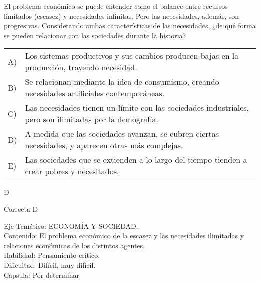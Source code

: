 \documentclass[letterpaper,11pt]{article}
\newcommand{\anchopregunta}{0.9\textwidth}
\begin{document}
\begin{enumerate}


\begin{minipage}{\anchopregunta}
\item El problema económico se puede entender como el balance entre recursos limitados (escasez) y necesidades infinitas. Pero las necesidades, además, son progresivas. Considerando ambas características de las necesidades, ¿de qué forma se pueden relacionar con las sociedades durante la historia?
\begin{flushleft}\begin{tabular}{@{\hspace{-.001\textwidth}}l@{\hspace{2pt}}p{}}
A)& Los sistemas productivos y sus cambios producen bajas en la producción, trayendo necesidad.\\
B)& Se relacionan mediante la idea de consumismo, creando necesidades artificiales contemporáneas.\\
C)& Las necesidades tienen un límite con las sociedades industriales, pero son ilimitadas por la demografía. \\
D)& A medida que las sociedades avanzan, se cubren ciertas necesidades, y aparecen otras más complejas.\\
E)& Las sociedades que se extienden a lo largo del tiempo tienden a crear pobres y necesitados.\\
\end{tabular}\end{flushleft}%
\begin{key} D
\end{key} 
\begin{hint}
\end{hint}
\begin{answer} Correcta D \\
\end{answer}
\begin{info} %
\begin{flushleft}
Eje Temático: ECONOMÍA Y SOCIEDAD.\\
Contenido: El problema económico de la escasez y las necesidades ilimitadas y relaciones económicas de los distintos agentes.\\
Habilidad: Pensamiento crítico.\\
Dificultad: Difícil, muy difícil.\\
Capsula: Por determinar \\
\end{flushleft} 
\end{info}
\end{minipage}\vfill$\;$ %


\end{enumerate}
\end{document}
